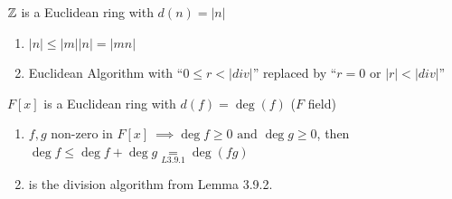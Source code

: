 \begin{example}
    ${\mathbb{ Z}}$ is a Euclidean ring with $d(n)=|n|$
    \begin{enumerate}
        \item $|n|\leq |m||n|=|mn| $
        \item Euclidean Algorithm with ``$0\leq r < |div|$'' replaced by ``$r=0$ or $|r|< |div|$''
    \end{enumerate}
\end{example}
\begin{example}
    $F[x]$ is a Euclidean ring with $d(f) = \deg (f)$ ($F$ field)
    \begin{enumerate}
        \item $f,g$ non-zero in $F[x] \ \implies \deg f \geq 0 \text{ and }\deg g\geq 0$, then $\deg f \leq \deg f + \deg g \underset{L3.9.1}{=} \deg(fg)$
        \item is the division algorithm from Lemma 3.9.2.
    \end{enumerate}
\end{example}
\newpage
